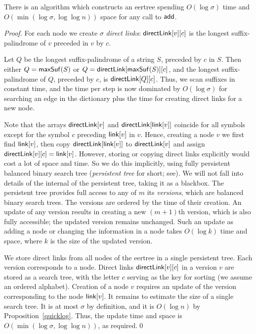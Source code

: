\documentclass{llncs}
\def\add{{\sf add}}
\def\maxsuf{{\sf maxSuf}}
\def\link{{\sf link}}
\def\direct{{\sf directLink}}
\begin{document}
\begin{proposition}
There is an algorithm which constructs an eertree spending $O(\log \sigma)$ time and $O(\min(\log\sigma, \log \log n))$ space for any call to $\add$. 
\end{proposition}

\begin{proof}
For each node we create $\sigma$ \emph{direct links}: $\direct[v][c]$ is the longest suffix-palindrome of $v$ preceded in $v$ by $c$. 

Let $Q$ be the longest suffix-palindrome of a string $S$, preceded by $c$ in $S$. Then either $Q=\maxsuf(S)$ or $Q=\direct[\maxsuf(S)][c]$, and the longest suffix-palindrome of $Q$, preceded by $c$, is $\direct[Q][c]$. Thus, we scan suffixes in constant time, and the time per step is now dominated by $O(\log\sigma)$ for searching an edge in the dictionary plus the time for creating direct links for a new node. 

Note that the arrays $\direct[v]$ and $\direct[\link[v]]$ coincide for all symbols except for the symbol $c$ preceding $\link[v]$ in $v$. Hence, creating a node $v$ we first find $\link[v]$, then copy $\direct[\link[v]]$ to $\direct[v]$ and assign $\direct[v][c]=\link[v]$. However, storing or copying direct links explicitly would cost a lot of space and time. So we do this implicitly, using fully persistent balanced binary search tree (\emph{persistent tree} for short; see\cite{DSST89}).  We will not fall into details of the internal of the persistent tree, taking it as a blackbox. The persistent tree provides full access to any of $m$ its \emph{versions}, which are balanced binary search trees. The versions are ordered by the time of their creation. An update of any version results in creating a new $(m{+}1)$th version, which is also fully accessible; the updated version remains unchanged. Such an update as adding a node or changing the information in a node takes $O(\log k)$ time and space, where $k$ is the size of the updated version. 

We store direct links from all nodes of the eertree in a single persistent tree. Each version corresponds to a node. Direct links $\direct[v][c]$ in a version $v$ are stored as a search tree, with the letter $c$ serving as the key for sorting (we assume an ordered alphabet). Creation of a node $v$ requires an update of the version corresponding to the node $\link[v]$. It remains to estimate the size of a single search tree. It is at most $\sigma$ by definition, and it is $O(\log n)$ by Proposition~\ref{quicklog}. Thus, the update time and space is $O(\min(\log \sigma, \log \log n))$, as required.\qed
\end{proof}
\end{document}
